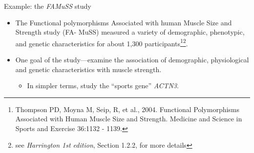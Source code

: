 \documentclass[10pt]{beamer}\usepackage[]{graphicx}\usepackage[]{color}
\begin{document}
\begin{frame}{Example: the \emph{FAMuSS} study}
	\protect\hypertarget{example-the-famuss-study}{}
	
\begin{itemize}
\item The Functional polymorphisms Associated with human Muscle Size and Strength study (FA-
MuSS) measured a variety of demographic, phenotypic, and genetic characteristics for about 1,300
participants\footnote{\tiny{Thompson PD, Moyna M, Seip, R, et al., 2004. Functional Polymorphisms Associated with Human Muscle Size and
		Strength. Medicine and Science in Sports and Exercise 36:1132 - 1139.}}\footnote[,2]{\tiny{see \emph{Harrington 1st edition}, Section 1.2.2, for more details}}. 
	
			\pause 
			
	\item One goal of the study---examine the association of demographic, physiological and genetic characteristics with muscle strength.
	
	\begin{itemize}
		\tightlist
		\item
		In simpler terms, study the ``sports gene'' \emph{ACTN3}.
	\end{itemize}
	
	
\end{itemize}
	
	
	
\end{frame}
\end{document}
